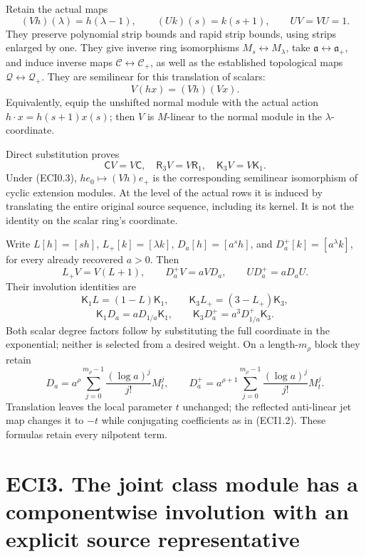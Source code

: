 Retain the actual maps \[
(Vh)(\lambda)=h(\lambda-1),\qquad
(Uk)(s)=k(s+1),\qquad UV=VU=1.
\tag{ECI2.1}
\] They preserve polynomial strip bounds and rapid strip bounds, using
strips enlarged by one. They give inverse ring isomorphisms
\(M_s\leftrightarrow M_\lambda\), take
\(\mathfrak a\leftrightarrow\mathfrak a_+\), and induce inverse maps
\(\mathscr C\leftrightarrow\mathscr C_+\), as well as the established
topological maps \(\mathcal Q\leftrightarrow\mathcal Q_+\). They are
semilinear for this translation of scalars: \[
V(hx)=(Vh)(Vx).
\tag{ECI2.2}
\] Equivalently, equip the unshifted normal module with the actual
action \(h\cdot x=h(s+1)x(s)\); then \(V\) is \(M\)-linear to the normal
module in the \(\lambda\)-coordinate.

Direct substitution proves \[
\mathsf C V=V\mathsf C,
\quad\mathsf R_3V=V\mathsf R_1,
\quad\mathsf K_3V=V\mathsf K_1.
\tag{ECI2.3}
\] Under (ECI0.3), \(h e_0\mapsto(Vh)e_+\) is the corresponding
semilinear isomorphism of cyclic extension modules. At the level of the
actual rows it is induced by translating the entire original source
sequence, including its kernel. It is not the identity on the scalar
ring's coordinate.

Write \(L[h]=[sh]\), \(L_+[k]=[\lambda k]\), \(D_a[h]=[a^s h]\), and
\(D_a^+[k]=[a^\lambda k]\), for every already recovered \(a>0\). Then \[
L_+V=V(L+1),\qquad
D_a^+V=aVD_a,\qquad
UD_a^+=aD_aU.
\tag{ECI2.4}
\] Their involution identities are \[
\mathsf K_1L=(1-L)\mathsf K_1,
\qquad\mathsf K_3L_+=(3-L_+)\mathsf K_3,
\] \[
\boxed{\mathsf K_1D_a=aD_{1/a}\mathsf K_1,
\qquad\mathsf K_3D_a^+=a^3D_{1/a}^+\mathsf K_3.}
\tag{ECI2.5}
\] Both scalar degree factors follow by substituting the full coordinate
in the exponential; neither is selected from a desired weight. On a
length-\(m_\rho\) block they retain \[
D_a=a^\rho\sum_{j=0}^{m_\rho-1}
\frac{(\log a)^j}{j!}M_t^j,
\qquad
D_a^+=a^{\rho+1}\sum_{j=0}^{m_\rho-1}
\frac{(\log a)^j}{j!}M_t^j.
\tag{ECI2.6}
\] Translation leaves the local parameter \(t\) unchanged; the reflected
anti-linear jet map changes it to \(-t\) while conjugating coefficients
as in (ECI1.2). These formulas retain every nilpotent term.

\section{ECI3. The joint class module has a componentwise involution
with an explicit source
representative}\label{eci3.-the-joint-class-module-has-a-componentwise-involution-with-an-explicit-source-representative}

